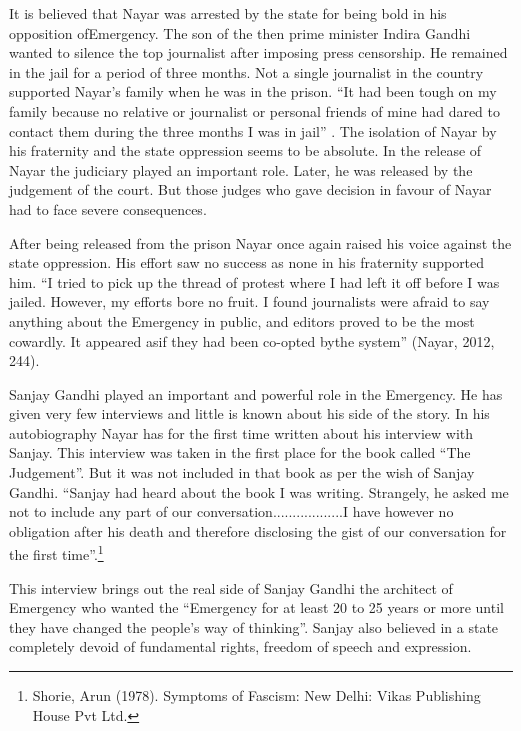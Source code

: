 \begin{multicols}{2}
\noi
It is believed that Nayar was arrested by the state for being bold in his opposition ofEmergency.
The son of the then prime minister Indira Gandhi wanted to silence the top journalist after
imposing press censorship. He remained in the jail for a period of three months. Not a single
journalist in the country supported Nayar’s family when he was in the prison. “It had been
tough on my family because no relative or journalist or personal friends of mine had dared to contact them during the three months I was in jail” . The isolation of Nayar by his fraternity
and the state oppression seems to be absolute. In the release of Nayar the judiciary played an
important role. Later, he was released by the judgement of the court. But those judges who
gave decision in favour of Nayar had to face severe consequences.

\newpage

\noi
After being released from the prison Nayar once again raised his voice against the state
oppression. His effort saw no success as none in his fraternity supported him. “I tried to pick
up the thread of protest where I had left it off before I was jailed. However, my efforts bore no
fruit. I found journalists were afraid to say anything about the Emergency in public, and editors
proved to be the most cowardly. It appeared asif they had been co-opted bythe system” (Nayar,
2012, 244).

\noi
Sanjay Gandhi played an important and powerful role in the Emergency. He has given very
few interviews and little is known about his side of the story. In his autobiography Nayar has
for the first time written about his interview with Sanjay. This interview was taken in the first
place for the book called “The Judgement”. But it was not included in that book as per the wish
of Sanjay Gandhi. “Sanjay had heard about the book I was writing. Strangely, he asked me not
to include any part of our conversation..................I have however no obligation after his death
and therefore disclosing the gist of our conversation for the first time”.\footnote{Shorie, Arun (1978). Symptoms of Fascism: New Delhi: Vikas Publishing House Pvt Ltd.}

\noi
This interview brings out the real side of Sanjay Gandhi the architect of Emergency who
wanted the “Emergency for at least 20 to 25 years or more until they have changed the people’s
way of thinking”. Sanjay also believed in a state completely devoid of fundamental rights,
freedom of speech and expression.


\end{multicols}
